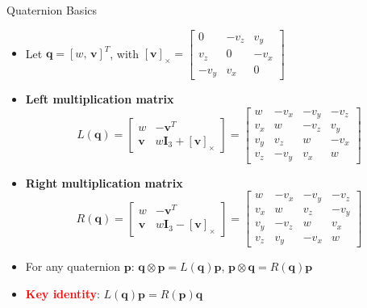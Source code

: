 \begin{frame}{Quaternion Basics}
    \begin{itemize}
        \setlength{\itemsep}{0.5em}
        \setlength{\parskip}{0.2em}
        \item Let $\mathbf{q}=[w,\,\mathbf{v}]^T$, with
        $[\mathbf{v}]_\times=\begin{bmatrix}0&-v_z&v_y\\ v_z&0&-v_x\\ -v_y&v_x&0\end{bmatrix}$
        \item \textbf{Left multiplication matrix}
        $$L(\mathbf{q})=\begin{bmatrix}
        w & -\mathbf{v}^T\\
        \mathbf{v} & w\mathbf{I}_3+[\mathbf{v}]_\times
        \end{bmatrix}=\begin{bmatrix}
        w & -v_x & -v_y & -v_z\\
        v_x & w & -v_z & v_y\\
        v_y & v_z & w & -v_x\\
        v_z & -v_y & v_x & w
        \end{bmatrix}$$
        \item \textbf{Right multiplication matrix}
        $$R(\mathbf{q})=\begin{bmatrix}
        w & -\mathbf{v}^T\\
        \mathbf{v} & w\mathbf{I}_3-[\mathbf{v}]_\times
        \end{bmatrix}=\begin{bmatrix}
        w & -v_x & -v_y & -v_z\\
        v_x & w & v_z & -v_y\\
        v_y & -v_z & w & v_x\\
        v_z & v_y & -v_x & w
        \end{bmatrix}$$
        \item For any quaternion $\mathbf{p}$:
        $\mathbf{q}\otimes\mathbf{p}=L(\mathbf{q})\mathbf{p}$, \quad
        $\mathbf{p}\otimes\mathbf{q}=R(\mathbf{q})\mathbf{p}$
        \item \textcolor{red}{\textbf{Key identity}}: $L(\mathbf{q})\mathbf{p}=R(\mathbf{p})\mathbf{q}$
    \end{itemize}
\end{frame}

